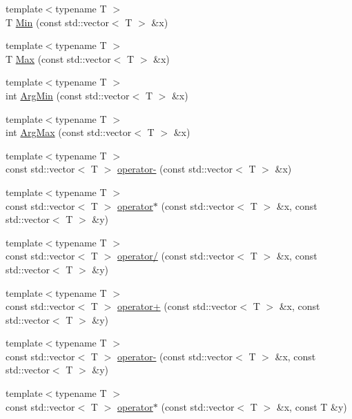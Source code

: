 \begin{DoxyCompactItemize}
\item 
{\footnotesize template$<$typename T $>$ }\\T \hyperlink{contrafold_2_utilities_8ipp_a2dd62e43a08f8d50213d9fdb3dbe2a6b}{Min} (const std\+::vector$<$ T $>$ \&x)
\item 
{\footnotesize template$<$typename T $>$ }\\T \hyperlink{contrafold_2_utilities_8ipp_af7b575076b6bd5018f1b2681f09770a3}{Max} (const std\+::vector$<$ T $>$ \&x)
\item 
{\footnotesize template$<$typename T $>$ }\\int \hyperlink{contrafold_2_utilities_8ipp_a3cab2f565c065835d243beabab3c2337}{Arg\+Min} (const std\+::vector$<$ T $>$ \&x)
\item 
{\footnotesize template$<$typename T $>$ }\\int \hyperlink{contrafold_2_utilities_8ipp_a98578538a8ce83b01d3973a1a171d4ec}{Arg\+Max} (const std\+::vector$<$ T $>$ \&x)
\item 
{\footnotesize template$<$typename T $>$ }\\const std\+::vector$<$ T $>$ \hyperlink{contrafold_2_utilities_8ipp_a568eb68e84ad744ccb15f88abf2db1a3}{operator-\/} (const std\+::vector$<$ T $>$ \&x)
\item 
{\footnotesize template$<$typename T $>$ }\\const std\+::vector$<$ T $>$ \hyperlink{contrafold_2_utilities_8ipp_a39ede280ac0ede640abe16fae764c3ff}{operator$\ast$} (const std\+::vector$<$ T $>$ \&x, const std\+::vector$<$ T $>$ \&y)
\item 
{\footnotesize template$<$typename T $>$ }\\const std\+::vector$<$ T $>$ \hyperlink{contrafold_2_utilities_8ipp_a48c7b9167c56e63b4acc2594f220bb4b}{operator/} (const std\+::vector$<$ T $>$ \&x, const std\+::vector$<$ T $>$ \&y)
\item 
{\footnotesize template$<$typename T $>$ }\\const std\+::vector$<$ T $>$ \hyperlink{contrafold_2_utilities_8ipp_a1334f27e41c96504343e1ac33dcff63b}{operator+} (const std\+::vector$<$ T $>$ \&x, const std\+::vector$<$ T $>$ \&y)
\item 
{\footnotesize template$<$typename T $>$ }\\const std\+::vector$<$ T $>$ \hyperlink{contrafold_2_utilities_8ipp_a836b51b046bfe8e04dae3d2528bf6795}{operator-\/} (const std\+::vector$<$ T $>$ \&x, const std\+::vector$<$ T $>$ \&y)
\item 
{\footnotesize template$<$typename T $>$ }\\const std\+::vector$<$ T $>$ \hyperlink{contrafold_2_utilities_8ipp_a3653a21d9593e7501f638b10ef5bf85f}{operator$\ast$} (const std\+::vector$<$ T $>$ \&x, const T \&y)

\end{DoxyCompactItemize}
